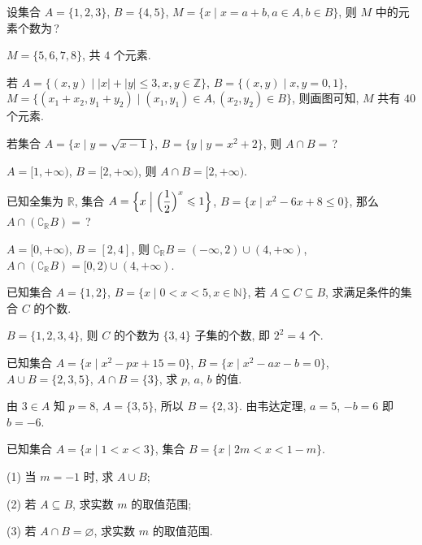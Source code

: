 \begin{exercise}
  设集合 $A=\{1,2,3\}$, $B=\{4,5\}$, $M=\{x\mid x=a+b,a\in A,b\in B\}$, 
  则 $M$ 中的元素个数为\,?
\end{exercise}

\beginsolution
  $M=\{5,6,7,8\}$, 共 $4$ 个元素.
  
  \varexercise 若 $A=\{(x,y)\mid |x|+|y|\leqslant 3, x,y\in\mathbb{Z}\}$, $B=\{(x,y)\mid x,y=0,1\}$, $M=\{(x_1+x_2,y_1+y_2)\mid (x_1,y_1)\in A, (x_2,y_2)\in B\}$, 则画图可知, $M$ 共有 $40$ 个元素.
\endsolution

\begin{exercise}
  若集合 $A=\{x\mid y=\sqrt{x-1}\}$, $B=\{y\mid y=x^2 +2\}$, 则 $A\cap B=$\,?
\end{exercise}

\beginsolution
  $A=[1,+\infty)$, $B=[2,+\infty)$, 则 $A\cap B=[2,+\infty)$.
\endsolution

\begin{exercise}
  已知全集为 $\mathbb{R}$, 集合 $A=\Bigl\{x\Bigm|\Big(\dfrac12\Big)^x\leqslant 1\Bigr\}$,
  $B=\{x\mid x^2-6x+8\leqslant 0\}$, 那么 $A\cap (\complement_{\mathbb{R}} B)=$\,?
\end{exercise}

\beginsolution
  $A=[0,+\infty)$, $B=[2,4]$, 则 $\complement_{\mathbb{R}} B= (-\infty,2)\cup (4,+\infty)$, $A\cap (\complement_{\mathbb{R}} B)=[0,2)\cup (4,+\infty)$.
\endsolution

\begin{exercise}
  已知集合 $A=\{1,2\}$, $B=\{x\mid 0<x<5, x\in\mathbb{N}\}$, 
  若 $A\subseteq C\subseteq B$, 求满足条件的集合 $C$ 的个数.
\end{exercise}

\beginsolution
  $B=\{1,2,3,4\}$, 则 $C$ 的个数为 $\{3,4\}$ 子集的个数, 即 $2^2=4$ 个.
\endsolution

\begin{exercise}
  已知集合 $A=\{x\mid x^2-px+15=0\}$, $B=\{x\mid x^2-ax-b=0\}$, 
  $A\cup B=\{2,3,5\}$, $A\cap B=\{3\}$, 求 $p$, $a$, $b$ 的值.
\end{exercise}

\beginsolution
  由 $3\in A$ 知 $p=8$, $A=\{3,5\}$, 所以 $B=\{2,3\}$. 由韦达定理, $a=5$, $-b=6$ 即 $b=-6$.
\endsolution

\begin{exercise}
  已知集合 $A=\{x\mid 1<x<3\}$, 集合 $B=\{x\mid 2m<x<1-m\}$.

  (1) 当 $m=-1$ 时, 求 $A\cup B$;
  
  (2) 若 $A\subseteq B$, 求实数 $m$ 的取值范围;

  (3) 若 $A\cap B=\varnothing$, 求实数 $m$ 的取值范围.
\end{exercise}

